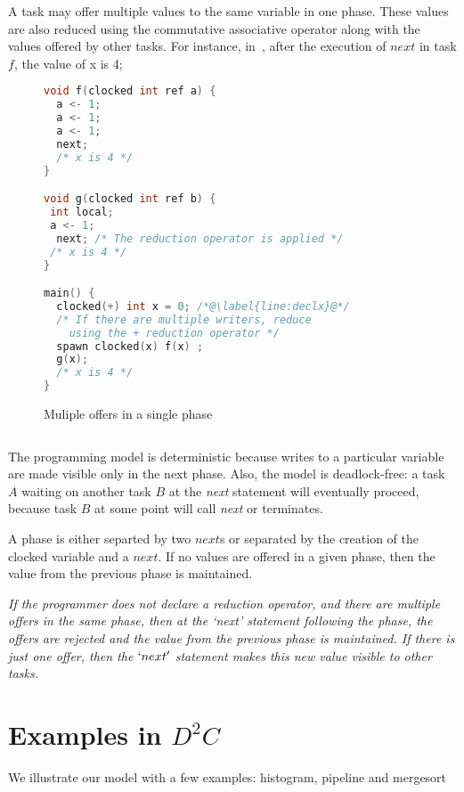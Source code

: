 \documentclass[10pt, conference, compsocconf]{IEEEtran}
\begin{document}
A task may offer multiple values to the same variable in one phase. These values are also reduced using the commutative associative operator along with the values offered by other tasks. For instance, in~, after the execution of 
$next$ in task $f$, the value of x is 4;
\begin{figure}
\begin{lstlisting}[language=C]
void f(clocked int ref a) {
  a <- 1;
  a <- 1;
  a <- 1;
  next;
  /* x is 4 */
}

void g(clocked int ref b) {
 int local;
 a <- 1;
  next; /* The reduction operator is applied */
 /* x is 4 */
}

main() {
  clocked(+) int x = 0; /*@\label{line:declx}@*/
  /* If there are multiple writers, reduce
    using the + reduction operator */
  spawn clocked(x) f(x) ;
  g(x);
  /* x is 4 */
}
\end{lstlisting}
\caption{Muliple offers in a single phase}
\label{fig:ddc-multiple}
\end{figure}





\begin{lstlisting}

\end{lstlisting}

The programming model is deterministic because writes to a particular variable
are made visible only in the next phase. Also, the model is deadlock-free: a task $A$ waiting on another task $B$ at the \emph{next} statement will eventually
proceed, because task $B$ at some point will call \emph{next} or terminates.

A phase is either separted by two $next$s or separated
by the creation of the clocked variable and a $next$.
If no values are offered in a given phase, then the value from
the previous phase is maintained.

{\it If the programmer does not declare a reduction operator, and there are multiple offers in the same phase, then  at the `next' statement following
the phase, the offers are rejected and the value from
the previous phase is maintained. If there is just one offer, then the $`next'$ statement makes this new value visible to other tasks.}


\section{Examples in $D^2C$}
\label{sec:examples}
We illustrate our model with a few examples: 
histogram, pipeline and mergesort
\end{document}

